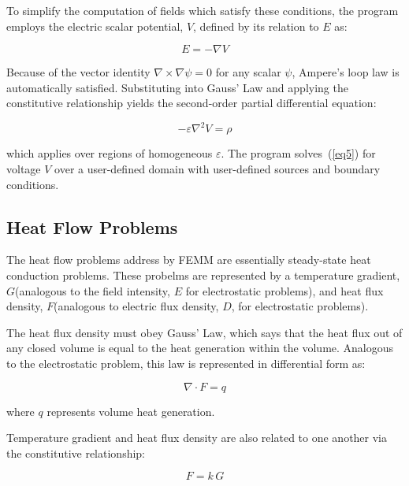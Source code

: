 \documentclass[12pt]{report}
\begin{document}
To simplify the computation of fields which satisfy these conditions,
the program employs the electric scalar potential, $V$, defined by its relation to $E$ as:

\begin{equation}
\label{eq4}
E = - \nabla V
\end{equation}

Because of the vector identity $\nabla \times \nabla \psi = 0$ for any
scalar \textit{$\psi $}, Ampere's loop law is automatically satisfied. Substituting into
Gauss' Law and applying the constitutive relationship yields the
second-order partial differential equation:

\begin{equation}
\label{eq5}
 - \varepsilon \nabla ^2V = \rho
\end{equation}

\noindent
which applies over regions of homogeneous \textit{$\varepsilon $}.
The program solves~(\ref{eq5}) for voltage $V$ over a user-defined
domain with user-defined sources and boundary conditions.

\subsection{Heat Flow Problems}

The heat flow problems address by FEMM are essentially steady-state
heat conduction problems. These probelms are represented by a
temperature gradient, $G$(analogous to the field intensity, $E$ for
electrostatic problems), and heat flux density, $F$(analogous to
electric flux density, $D$, for electrostatic problems).

The heat flux density must obey Gauss' Law, which says that the
heat flux out of any closed volume is equal to the heat generation
within the volume. Analogous to the electrostatic problem, this law
is represented in differential form as:

\begin{equation}
\label{eq1h}
\nabla \cdot F = q
\end{equation}

\noindent
where $q$ represents volume heat generation.

\noindent
Temperature gradient and heat flux density are also related to one
another via the constitutive relationship:

\begin{equation}
\label{eq3h}
F = k\,G
\end{equation}
\end{document}
